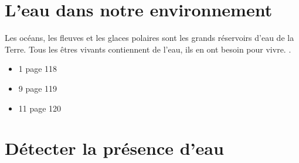 \documentclass[12pt,a4paper]{article}
\date{}
\title{}
\begin{document}
	
	

\section{L'eau dans notre environnement}


\begin{mybilan}
	Les océans, les fleuves et les glaces polaires sont les grands réservoirs d'eau de la Terre. Tous les êtres vivants contiennent de l'eau, ils en ont besoin pour vivre. .
\end{mybilan}

\begin{myexos}
	\begin{itemize}
		\item 1 page 118
		\item 9 page 119
		\item 11 page 120
	\end{itemize}
\end{myexos}

\section{Détecter la présence d'eau}
\end{document}
